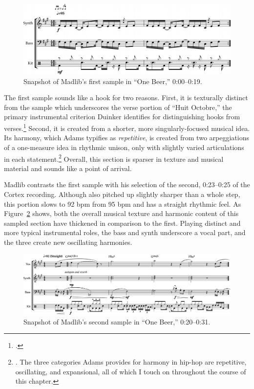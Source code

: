     \begin{figure}[ht]
        \centering
        \includegraphics[width=\textwidth]{images/figures/chp 02/000019onebeerintro.pdf}
        \caption{Snapshot of Madlib's first sample in ``One Beer,'' 0:00--0:19.}
        \label{fig:onebeerintro}
    \end{figure}

The first sample sounds like a hook for two reasons. First, it is texturally distinct from
the sample  which underscores the verse portion of ``Huit Octobre,'' the primary instrumental
criterion Duinker identifies for distinguishing hooks from verses.\footnote{
    \autocite[99]{benduinkerSongFormMainstreaming2020}.}
Second, it is created from a shorter, more singularly-focused musical idea. Its harmony, which
Adams  typifies as \emph{repetitive}, is created from two arpeggiations of a one-measure idea
in rhythmic unison, only with slightly varied articulations in each statement.\footnote{
    \cite{kyleadamsHarmonicSyntacticMotivic2020}. The three categories Adams provides for 
    harmony in hip-hop are repetitive, oscillating, and expansional, all of which I touch on
    throughout the course of this chapter.} 
Overall, this section is sparser in texture and musical material and sounds like a point of
arrival.

Madlib contrasts the first sample with his selection of the second, 0:23--0:25 of the Cortex
recording. Although also pitched up slightly sharper than a whole step, this portion slows 
to 92 bpm from 95 bpm  and has a straight rhythmic feel. As Figure~\ref{fig:onebeermain} 
shows, both the overall musical texture and harmonic content of this sampled section have 
thickened in comparison to the first. Playing distinct and more typical instrumental roles,
the bass and synth underscore a vocal part, and the three create new oscillating harmonies.

    \begin{figure}[ht]
        \centering
        \includegraphics[width=\textwidth]{images/figures/chp 02/020031onebeermain.pdf}
        \caption{Snapshot of Madlib's second sample in ``One Beer,'' 0:20--0:31.}
        \label{fig:onebeermain}
    \end{figure}


